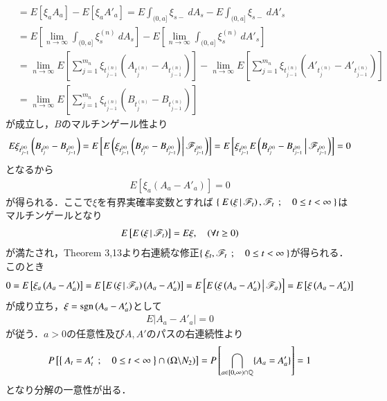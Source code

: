 \begin{prf}
\begin{description}
\begin{align}
					&= E\left[ \xi_a A_a \right] -  E\left[ \xi_a A'_a \right]
					= E \int_{(0,a]} \xi_{s-}\ dA_s - E\int_{(0,a]} \xi_{s-}\ dA'_s \\
					&= E \left[ \lim_{n \to \infty} \int_{(0,a]} \xi^{(n)}_s\ dA_s \right]
						- E \left[ \lim_{n \to \infty} \int_{(0,a]} \xi^{(n)}_s\ dA'_s \right] \\
					&= \lim_{n \to \infty} E\left[ \sum_{j=1}^{m_n}\xi_{t^{(n)}_{j-1}}\left( A_{t^{(n)}_j} - A_{t^{(n)}_{j-1}} \right) \right]
						-  \lim_{n \to \infty} E \left[ \sum_{j=1}^{m_n}\xi_{t^{(n)}_{j-1}}\left( A'_{t^{(n)}_j} - A'_{t^{(n)}_{j-1}} \right) \right] \\
					&= \lim_{n \to \infty} E \left[ \sum_{j=1}^{m_n}\xi_{t^{(n)}_{j-1}}\left( B_{t^{(n)}_j} - B_{t^{(n)}_{j-1}} \right) \right]
				\end{align}
				が成立し，$B$のマルチンゲール性より
				\begin{align}
					E\xi_{t^{(n)}_{j-1}}\left( B_{t^{(n)}_j} - B_{t^{(n)}_{j-1}} \right)
					= E \left[E\left( \xi_{t^{(n)}_{j-1}}\left( B_{t^{(n)}_j} - B_{t^{(n)}_{j-1}} \right) \, \middle|\, \mathscr{F}_{t^{(n)}_{j-1}} \right) \right]
					= E \left[ \xi_{t^{(n)}_{j-1}}E\left( B_{t^{(n)}_j} - B_{t^{(n)}_{j-1}} \, \middle|\, \mathscr{F}_{t^{(n)}_{j-1}} \right) \right]
					= 0 
				\end{align}
				となるから
				\begin{align}
					E\left[ \xi_a\left( A_a - A'_a \right) \right] = 0
				\end{align}
				が得られる．ここで$\xi$を有界実確率変数とすれば
				$\left\{\ E\left( \xi \, \middle|\, \mathscr{F}_t \right),\mathscr{F}_t\ \, ; \quad 0 \leq t < \infty\ \right\}$はマルチンゲールとなり
				\begin{align}
					E\left[ E\left( \xi \, \middle|\, \mathscr{F}_t \right) \right] = E \xi,
					\quad (\forall t \geq 0)
				\end{align}
				が満たされ，Theorem 3,13より右連続な修正$\left\{\ \xi_t,\mathscr{F}_t\ \, ; \quad 0 \leq t < \infty\ \right\}$が得られる．
				このとき
				\begin{align}
					0 = E\left[ \xi_a\left( A_a - A'_a \right) \right]
					= E\left[ E\left( \xi \, \middle|\, \mathscr{F}_a \right)\left( A_a - A'_a \right) \right]
					= E\left[ E\left( \xi\left( A_a - A'_a \right) \, \middle|\, \mathscr{F}_a \right) \right]
					= E\left[ \xi\left( A_a - A'_a \right) \right]
				\end{align}
				が成り立ち，$\xi = \operatorname{sgn}\left( A_a - A'_a \right)$として
				\begin{align}
					E\left| A_a - A'_a \right| = 0
				\end{align}
				が従う．$a > 0$の任意性及び$A,A'$のパスの右連続性より
				\begin{align}
					P\left[ \left\{\ A_t = A'_t\ \, ; \quad 0 \leq t < \infty\ \right\} \cap (\Omega \backslash N_2) \right]
					= P\left[ \bigcap_{a \in [0,\infty) \cap \mathbb{Q}} \{A_a=A'_a\} \right]
					= 1
				\end{align}
				となり分解の一意性が出る．
				

\end{description}
\end{prf}
